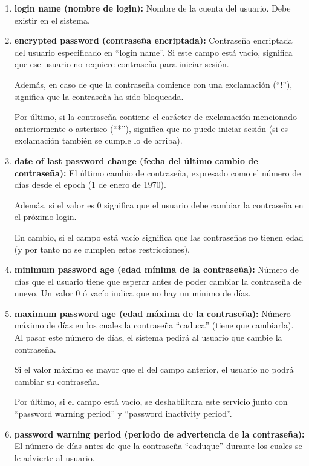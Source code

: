 \documentclass{article}
\begin{document}
\begin{enumerate}
    \item \textbf{login name (nombre de login): }Nombre de la cuenta del usuario. Debe existir en el sistema.
    
    \item \textbf{encrypted password (contraseña encriptada): }Contraseña encriptada del usuario especificado en ``login name''. Si este campo está vacío, significa que ese usuario no requiere contraseña para iniciar sesión. 
    
    Además, en caso de que la contraseña comience con una exclamación (``!''), significa que la contraseña ha sido bloqueada.

    Por último, si la contraseña contiene el carácter de exclamación mencionado anteriormente o asterisco (``*''), significa que no puede iniciar sesión (si es exclamación también se cumple lo de arriba).

    \item \textbf{date of last password change (fecha del último cambio de contraseña): }El último cambio de contraseña, expresado como el número de días desde el epoch (1 de enero de 1970).
    
    Además, si el valor es 0 significa que el usuario debe cambiar la contraseña en el próximo login.

    En cambio, si el campo está vacío significa que las contraseñas no tienen edad (y por tanto no se cumplen estas restricciones).

    \item \textbf{minimum password age (edad mínima de la contraseña): }Número de días que el usuario tiene que esperar antes de poder cambiar la contraseña de nuevo. Un valor 0 ó vacío indica que no hay un mínimo de días.
    \item \textbf{maximum password age (edad máxima de la contraseña): }Número máximo de días en los cuales la contraseña ``caduca'' (tiene que cambiarla). Al pasar este número de días, el sistema pedirá al usuario que cambie la contraseña.
    
    Si el valor máximo es mayor que el del campo anterior, el usuario no podrá cambiar su contraseña.

    Por último, si el campo está vacío, se deshabilitara este servicio junto con ``password warning period'' y ``password inactivity period''.

    \item \textbf{password warning period (periodo de advertencia de la contraseña): }El número de días antes de que la contraseña ``caduque'' durante los cuales se le  advierte al usuario.
    

\end{enumerate}
\end{document}
